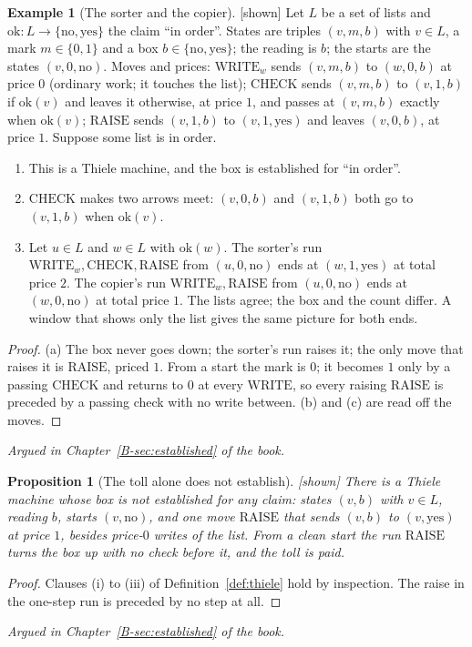 \documentclass[11pt, a4paper]{article}
\theoremstyle{plain}
\newtheorem{proposition}[theorem]{Proposition}
\theoremstyle{definition}
\newtheorem{example}[theorem]{Example}
\theoremstyle{remark}
\newcommand{\Bool}{\{\mathrm{no},\mathrm{yes}\}}
\newcommand{\argued}[1]{\par\noindent\textit{Argued in Chapter~\ref{B-#1} of the book.}\par}
\newcommand{\kind}[1]{\textup{[#1]}}
\begin{document}
\begin{example}[The sorter and the copier]\label{spec:sorter-copier} \kind{shown}
Let $L$ be a set of lists and $\mathrm{ok}:L\to\Bool$ the claim ``in order''. States are triples $(v,m,b)$
with $v\in L$, a mark $m\in\{0,1\}$ and a box $b\in\Bool$; the reading is $b$; the starts are the states
$(v,0,\mathrm{no})$. Moves and prices:
$\mathrm{WRITE}_w$ sends $(v,m,b)$ to $(w,0,b)$ at price $0$ (ordinary work; it touches the list);
$\mathrm{CHECK}$ sends $(v,m,b)$ to $(v,1,b)$ if $\mathrm{ok}(v)$ and leaves it otherwise, at price $1$, and
passes at $(v,m,b)$ exactly when $\mathrm{ok}(v)$;
$\mathrm{RAISE}$ sends $(v,1,b)$ to $(v,1,\mathrm{yes})$ and leaves $(v,0,b)$, at price $1$.
Suppose some list is in order.
\begin{enumerate}[label=(\alph*)]
\item This is a Thiele machine, and the box is established for ``in order''.
\item $\mathrm{CHECK}$ makes two arrows meet: $(v,0,b)$ and $(v,1,b)$ both go to $(v,1,b)$ when
$\mathrm{ok}(v)$.
\item Let $u\in L$ and $w\in L$ with $\mathrm{ok}(w)$. The sorter's run $\mathrm{WRITE}_w,\mathrm{CHECK},
\mathrm{RAISE}$ from $(u,0,\mathrm{no})$ ends at $(w,1,\mathrm{yes})$ at total price $2$. The copier's run
$\mathrm{WRITE}_w,\mathrm{RAISE}$ from $(u,0,\mathrm{no})$ ends at $(w,0,\mathrm{no})$ at total price $1$. The
lists agree; the box and the count differ. A window that shows only the list gives the same picture for
both ends.
\end{enumerate}
\end{example}
\begin{proof}
(a) The box never goes down; the sorter's run raises it; the only move that raises it is $\mathrm{RAISE}$,
priced $1$. From a start the mark is $0$; it becomes $1$ only by a passing $\mathrm{CHECK}$ and returns to $0$
at every $\mathrm{WRITE}$, so every raising $\mathrm{RAISE}$ is preceded by a passing check with no write
between. (b) and (c) are read off the moves.
\end{proof}
\argued{sec:established}

\begin{proposition}[The toll alone does not establish]\label{spec:bare-toll} \kind{shown}
There is a Thiele machine whose box is not established for any claim: states $(v,b)$ with $v\in L$, reading
$b$, starts $(v,\mathrm{no})$, and one move $\mathrm{RAISE}$ that sends $(v,b)$ to $(v,\mathrm{yes})$ at
price $1$, besides price-$0$ writes of the list. From a clean start the run $\mathrm{RAISE}$ turns the box up
with no check before it, and the toll is paid.
\end{proposition}
\begin{proof}
Clauses (i) to (iii) of Definition~\ref{def:thiele} hold by inspection. The raise in the one-step run is
preceded by no step at all.
\end{proof}
\argued{sec:established}
\end{document}
